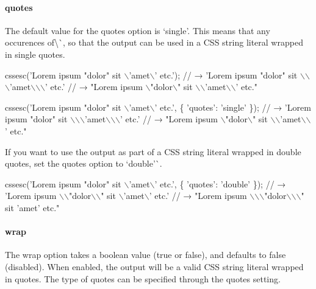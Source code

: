 \paragraph*{{\ttfamily quotes}}

The default value for the {\ttfamily quotes} option is `\textquotesingle{}single'{\ttfamily . This means that any occurences of}\textbackslash{}\textquotesingle{}\`{}, so that the output can be used in a C\+SS string literal wrapped in single quotes.


\begin{DoxyCode}
cssesc('Lorem ipsum "dolor" sit \(\backslash\)'amet\(\backslash\)' etc.');
// → 'Lorem ipsum "dolor" sit \(\backslash\)\(\backslash\)\(\backslash\)'amet\(\backslash\)\(\backslash\)\(\backslash\)' etc.'
// → "Lorem ipsum \(\backslash\)"dolor\(\backslash\)" sit \(\backslash\)\(\backslash\)'amet\(\backslash\)\(\backslash\)' etc."

cssesc('Lorem ipsum "dolor" sit \(\backslash\)'amet\(\backslash\)' etc.', \{
  'quotes': 'single'
\});
// → 'Lorem ipsum "dolor" sit \(\backslash\)\(\backslash\)\(\backslash\)'amet\(\backslash\)\(\backslash\)\(\backslash\)' etc.'
// → "Lorem ipsum \(\backslash\)"dolor\(\backslash\)" sit \(\backslash\)\(\backslash\)'amet\(\backslash\)\(\backslash\)' etc."
\end{DoxyCode}


If you want to use the output as part of a C\+SS string literal wrapped in double quotes, set the {\ttfamily quotes} option to `\textquotesingle{}double'\`{}.


\begin{DoxyCode}
cssesc('Lorem ipsum "dolor" sit \(\backslash\)'amet\(\backslash\)' etc.', \{
  'quotes': 'double'
\});
// → 'Lorem ipsum \(\backslash\)\(\backslash\)"dolor\(\backslash\)\(\backslash\)" sit \(\backslash\)'amet\(\backslash\)' etc.'
// → "Lorem ipsum \(\backslash\)\(\backslash\)\(\backslash\)"dolor\(\backslash\)\(\backslash\)\(\backslash\)" sit 'amet' etc."
\end{DoxyCode}


\paragraph*{{\ttfamily wrap}}

The {\ttfamily wrap} option takes a boolean value ({\ttfamily true} or {\ttfamily false}), and defaults to {\ttfamily false} (disabled). When enabled, the output will be a valid C\+SS string literal wrapped in quotes. The type of quotes can be specified through the {\ttfamily quotes} setting.


